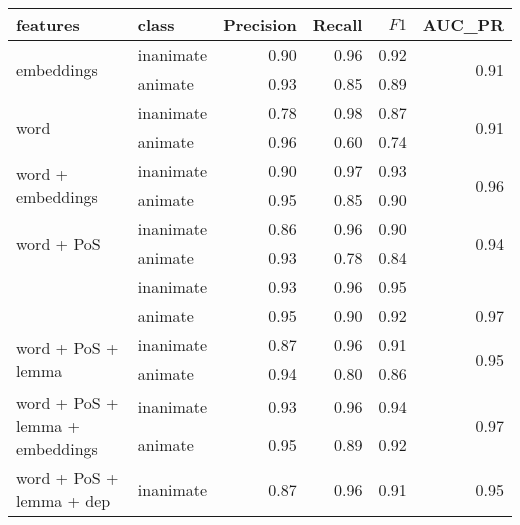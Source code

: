 \documentclass[a4paper,UKenglish]{oasics}
\begin{document}
\begin{table}
\centering
\begin{tabular}{llrrrr}
\toprule
features & class &  Precision &  Recall & $F1$ &  AUC_{PR} \\
\midrule
\multirow{2}{*}{embeddings}                            & inanimate     &       0.90 &    0.96 &    0.92 & \multirow{2}{*}{0.91} \\
                                                       & animate       &       0.93 &    0.85 &    0.89 &  \\
\multirow{2}{*}{word}                                  & inanimate     &       0.78 &    0.98 &    0.87 & \multirow{2}{*}{0.91} \\
                                                       & animate       &       0.96 &    0.60 &    0.74 &  \\
\multirow{2}{*}{word + embeddings}                     & inanimate     &       0.90 &    0.97 &    0.93 & \multirow{2}{*}{0.96} \\
                                                       & animate       &       0.95 &    0.85 &    0.90 &  \\
\multirow{2}{*}{word + PoS}                            & inanimate     &       0.86 &    0.96 &    0.90 & \multirow{2}{*}{0.94} \\
                                                       & animate       &       0.93 &    0.78 &    0.84 &  \\
\rowcolor{Gray}                                        & inanimate     &       0.93 &    0.96 &    0.95 &  \\
\rowcolor{Gray}\multirow{-2}{*}{word + PoS + embeddings} & animate       &       0.95 &    0.90 &    0.92 &\multirow{-2}{*}{0.97}  \\
\multirow{2}{*}{word + PoS + lemma}                    & inanimate     &       0.87 &    0.96 &    0.91 & \multirow{2}{*}{0.95} \\
                                                       & animate       &       0.94 &    0.80 &    0.86 &  \\
\multirow{2}{*}{word + PoS + lemma + embeddings}       & inanimate     &       0.93 &    0.96 &    0.94 & \multirow{2}{*}{0.97} \\
                                                       & animate       &       0.95 &    0.89 &    0.92 &  \\
\multirow{2}{*}{word + PoS + lemma + dep}              & inanimate     &       0.87 &    0.96 &    0.91 & \multirow{2}{*}{0.95} \\

\end{tabular}
\end{table}
\end{document}
